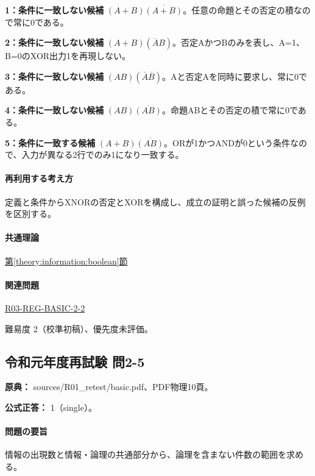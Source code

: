 \noindent\textbf{1：条件に一致しない候補} \((A+B)\overline{(A+B)}\)。任意の命題とその否定の積なので常に0である。\par

\noindent\textbf{2：条件に一致しない候補} \((A+B)(\overline A B)\)。否定AかつBのみを表し、A=\allowbreak{}1、B=\allowbreak{}0のXOR出力1を再現しない。\par

\noindent\textbf{3：条件に一致しない候補} \((AB)(\overline A\overline B)\)。Aと否定Aを同時に要求し、常に0である。\par

\noindent\textbf{4：条件に一致しない候補} \((AB)\overline{(AB)}\)。命題ABとその否定の積で常に0である。\par

\noindent\textbf{5：条件に一致する候補} \((A+B)\overline{(AB)}\)。ORが1かつANDが0という条件なので、入力が異なる2行でのみ1になり一致する。\par

\paragraph{再利用する考え方} 定義と条件からXNORの否定とXORを構成し、成立の証明と誤った候補の反例を区別する。

\paragraph{共通理論} \hyperref[theory:information:boolean]{第\ref*{theory:information:boolean}節}

\paragraph{関連問題} \hyperref[q:r03-reg-basic-2-2]{R03-REG-BASIC-2-2}

\par 難易度 2（校準初稿）、優先度未評価。

\subsection{令和元年度再試験 問2-5}
\label{q:r01-ret-basic-2-5}

\noindent\textbf{原典：} sources/R01\_retest/basic.pdf、PDF物理10頁。

\textbf{公式正答：} 1（single）。

\paragraph{問題の要旨} 情報の出現数と情報・論理の共通部分から、論理を含まない件数の範囲を求める。

